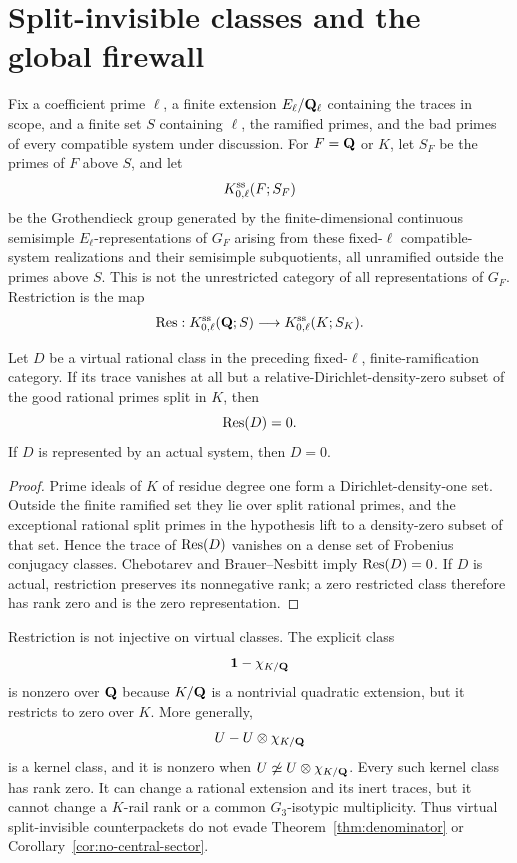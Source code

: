 \section{Split-invisible classes and the global firewall}
\label{sec:counterpacket}

Fix a coefficient prime \(\ell\), a finite extension
\(E_\ell/\mathbf Q_\ell\) containing the traces in scope, and a finite set \(S\)
containing \(\ell\), the ramified primes, and the bad primes of every
compatible system under discussion.  For \(F=\mathbf Q\) or \(K\), let \(S_F\)
be the primes of \(F\) above \(S\), and let
\[
K_{0,\ell}^{\mathrm{ss}}(F;S_F)
\]
be the Grothendieck group generated by the finite-dimensional continuous
semisimple \(E_\ell\)-representations of \(G_F\) arising from these
fixed-\(\ell\) compatible-system realizations and their semisimple
subquotients, all unramified outside the primes above \(S\).  This is not
the unrestricted category of all representations of \(G_F\).  Restriction
is the map
\[
\operatorname{Res}:K_{0,\ell}^{\mathrm{ss}}(\mathbf Q;S)
\longrightarrow K_{0,\ell}^{\mathrm{ss}}(K;S_K).
\]

\begin{proposition}
\label{prop:counterpacket}
Let \(D\) be a virtual rational class in the preceding fixed-\(\ell\),
finite-ramification category.  If its trace vanishes at all but a
relative-Dirichlet-density-zero subset of the good rational primes split in
\(K\), then
\[
\operatorname{Res}(D)=0.
\]
If \(D\) is represented by an actual system, then \(D=0\).
\end{proposition}

\begin{proof}
Prime ideals of \(K\) of residue degree one form a
Dirichlet-density-one set.  Outside the finite ramified set they lie over
split rational primes, and the exceptional rational split primes in the
hypothesis lift to a density-zero subset of that set.  Hence the trace of
\(\operatorname{Res}(D)\) vanishes on a dense set of Frobenius conjugacy classes.
Chebotarev and Brauer--Nesbitt imply \(\operatorname{Res}(D)=0\).  If \(D\) is
actual, restriction preserves its nonnegative rank; a zero restricted class
therefore has rank zero and is the zero representation.
\end{proof}

Restriction is not injective on virtual classes.  The explicit class
\begin{equation}
\mathbf 1-\chi_{K/\mathbf Q}
\label{eq:explicit-kernel-class}
\end{equation}
is nonzero over \(\mathbf Q\) because \(K/\mathbf Q\) is a nontrivial quadratic
extension, but it restricts to zero over \(K\).  More generally,
\[
U-U\otimes\chi_{K/\mathbf Q}
\]
is a kernel class, and it is nonzero when
\(U\not\simeq U\otimes\chi_{K/\mathbf Q}\).  Every such kernel class has rank
zero.  It can change a rational extension and its inert traces, but it
cannot change a \(K\)-rail rank or a common \(G_3\)-isotypic
multiplicity.  Thus virtual split-invisible counterpackets do not evade
Theorem~\ref{thm:denominator} or
Corollary~\ref{cor:no-central-sector}.

